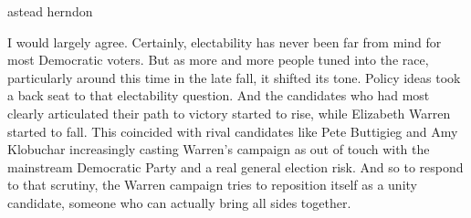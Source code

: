 astead herndon

I would largely agree. Certainly, electability has never been far from
mind for most Democratic voters. But as more and more people tuned into
the race, particularly around this time in the late fall, it shifted its
tone. Policy ideas took a back seat to that electability question. And
the candidates who had most clearly articulated their path to victory
started to rise, while Elizabeth Warren started to fall. This coincided
with rival candidates like Pete Buttigieg and Amy Klobuchar increasingly
casting Warren's campaign as out of touch with the mainstream Democratic
Party and a real general election risk. And so to respond to that
scrutiny, the Warren campaign tries to reposition itself as a unity
candidate, someone who can actually bring all sides together.

